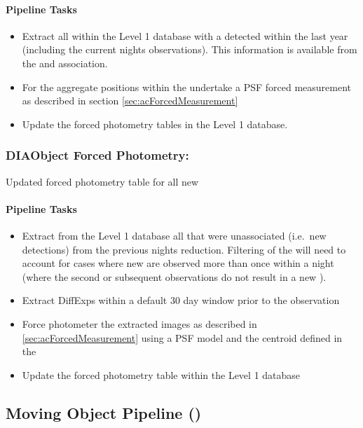 \paragraph{Pipeline Tasks}

\begin{itemize}
\item Extract all \DIAObjects within the Level 1 database with a detected \DIASource within the last year (including the current nights observations). This information is available from the \DIASource and \DIAObject association.  
\item For the aggregate positions within the \DIAObject undertake a PSF forced measurement as described in section \ref{sec:acForcedMeasurement}
\item Update the forced photometry tables in the Level 1 database.
\end{itemize}



\subsubsection{DIAObject Forced Photometry:} 

Updated forced photometry table for all new \DIAObjects


\paragraph{Pipeline Tasks}

\begin{itemize}
\item Extract from the Level 1 database all \DIAObjects that were unassociated (i.e.\ new \DIASource detections) from the previous nights reduction. Filtering of the \DIAObjects will need to account for cases where new \DIASources are observed more than once within a night (where the second or subsequent observations do not result in a new \DIAObject).
\item Extract DiffExps within a  default 30 day window prior to the observation
\item Force photometer the extracted images as described in \ref{sec:acForcedMeasurement} using a PSF model and the centroid defined in the \DIAObject
\item Update the forced photometry table within the Level 1 database
\end{itemize}
\clearpage



\subsection{Moving Object Pipeline (\wbsMOPS)}

